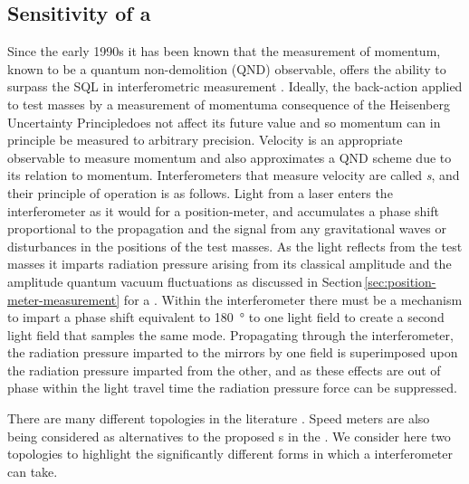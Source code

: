 \subsection{\label{sec:speed-meter-measurement}Sensitivity of a \SM{}}
Since the early 1990s it has been known that the measurement of momentum, known to be a quantum non-demolition (\gls{QND}) observable, offers the ability to surpass the \gls{SQL} in interferometric measurement \cite{Braginsky1990}. Ideally, the back-action applied to test masses by a measurement of momentum\textemdash a consequence of the Heisenberg Uncertainty Principle\textemdash does not affect its future value and so momentum can in principle be measured to arbitrary precision. Velocity is an appropriate observable to measure momentum and also approximates a \gls{QND} scheme due to its relation to momentum. Interferometers that measure velocity are called \emph{\SM{}s}, and their principle of operation is as follows. Light from a laser enters the interferometer as it would for a position-meter, and accumulates a phase shift proportional to the propagation and the signal from any gravitational waves or disturbances in the positions of the test masses. As the light reflects from the test masses it imparts radiation pressure arising from its classical amplitude and the amplitude quantum vacuum fluctuations as discussed in Section\,\ref{sec:position-meter-measurement} for a \FPMI{}. Within the interferometer there must be a mechanism to impart a phase shift equivalent to \SI{180}{\degree} to one light field to create a second light field that samples the same mode. Propagating through the interferometer, the radiation pressure imparted to the mirrors by one field is superimposed upon the radiation pressure imparted from the other, and as these effects are out of phase within the light travel time the radiation pressure force can be suppressed.

There are many different \SM{} topologies in the literature \cite{Danilishin2004, Wang2013, Huttner2016, Wade2012}. Speed meters are also being considered as alternatives to the proposed \MI{}s in the \ET{} \cite{MuellerEbhardt2009a, Voronchev2015}. We consider here two \SM{} topologies to highlight the significantly different forms in which a \SM{} interferometer can take.

